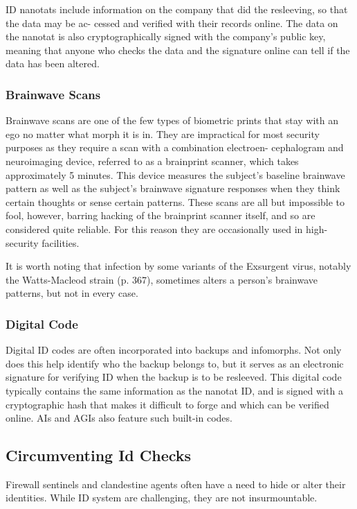 ID nanotats include information on the company 
that did the resleeving, so that the data may be ac-
cessed and verified with their records online. The data 
on the nanotat is also cryptographically signed with 
the company's public key, meaning that anyone who 
checks the data and the signature online can tell if the 
data has been altered.

\subsubsection{Brainwave Scans}

Brainwave scans are one of the few types of biometric 
prints that stay with an ego no matter what morph it 
is in. They are impractical for most security purposes 
as they require a scan with a combination electroen-
cephalogram and neuroimaging device, referred to as 
a brainprint scanner, which takes approximately 5 
minutes. This device measures the subject's baseline 
brainwave pattern as well as the subject's brainwave 
signature responses when they think certain thoughts 
or sense certain patterns. These scans are all but 
impossible to fool, however, barring hacking of the 
brainprint scanner itself, and so are considered quite 
reliable. For this reason they are occasionally used in 
high-security facilities.

It is worth noting that infection by some variants 
of the Exsurgent virus, notably the Watts-Macleod 
strain (p. 367), sometimes alters a person's brainwave 
patterns, but not in every case.

\subsubsection{Digital Code}

Digital ID codes are often incorporated into backups and 
infomorphs. Not only does this help identify who the 
backup belongs to, but it serves as an electronic signature 
for verifying ID when the backup is to be resleeved. This 
digital code typically contains the same information as 
the nanotat ID, and is signed with a cryptographic hash 
that makes it difficult to forge and which can be verified 
online. AIs and AGIs also feature such built-in codes.

\subsection{Circumventing Id Checks}

Firewall sentinels and clandestine agents often have a 
need to hide or alter their identities. While ID system 
are challenging, they are not insurmountable.

